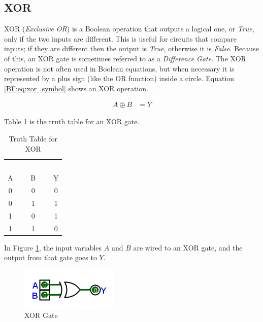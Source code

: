 \subsection{XOR}
\label{BF:subsec:xor}

\textsf{XOR} (\emph{Exclusive OR}) is a Boolean operation that outputs a logical one, or \emph{True}, only if the two inputs are different. This is useful for circuits that compare inputs; if they are different then the output is \emph{True}, otherwise it is \emph{False}. Because of this, an \textsf{XOR}  gate is sometimes referred to as a \emph{Difference Gate}. The \textsf{XOR} operation is not often used in Boolean equations, but when necessary it is represented by a plus sign (like the OR function) inside a circle. Equation \ref{BF:eq:xor_symbol} shows an \textsf{XOR}  operation.

\begin{align}
  \label{BF:eq:xor_symbol}
  A \oplus B &= Y
\end{align}

Table \ref{BF:tab:truth_table_for_xor} is the truth table for an \textsf{XOR}  gate.

\begin{table}[H]
  \sffamily
  \newcommand{\head}[1]{\textcolor{white}{\textbf{#1}}}    
  \begin{center}
    \begin{tabular}{ccc} 
      \rowcolor{black!75}
      \multicolumn{2}{c}{\head{Inputs}} & \head{Output} \\
      A & B & Y \\
      \hline
      0 & 0 & 0 \\
      0 & 1 & 1 \\
      1 & 0 & 1 \\
      1 & 1 & 0 
    \end{tabular}
  \end{center}
  \caption{Truth Table for XOR}
  \label{BF:tab:truth_table_for_xor}
\end{table}

In Figure \ref{fig:04_07}, the input variables $ A $ and $ B $ are wired to an \textsf{XOR}  gate, and the output from that gate goes to $ Y $. 

\begin{figure}[H]
	\centering
	\includegraphics[width=\maxwidth{.95\linewidth}]{gfx/04_07}
	\caption{XOR Gate}
	\label{fig:04_07}
\end{figure}


